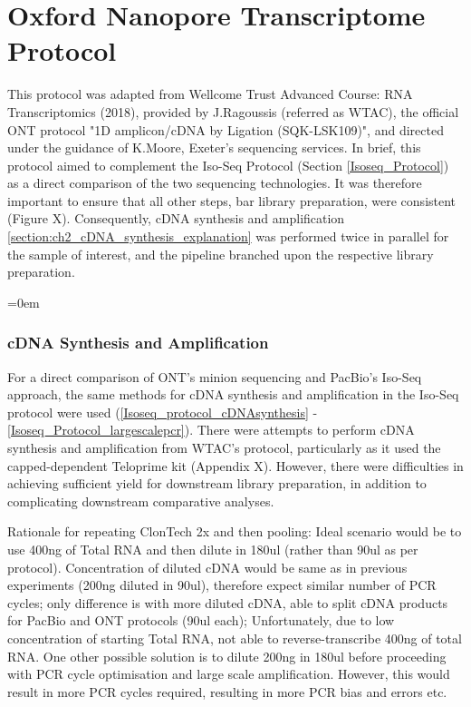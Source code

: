 \chapter{Oxford Nanopore Transcriptome Protocol}
\label{app_longread_ont_protocol}


This protocol was adapted from Wellcome Trust Advanced Course: RNA Transcriptomics (2018), provided by J.Ragoussis (referred as WTAC), the official ONT protocol "1D amplicon/cDNA by Ligation (SQK-LSK109)", and directed under the guidance of K.Moore, Exeter's sequencing services. In brief, this protocol aimed to complement the Iso-Seq Protocol (Section \ref{Isoseq_Protocol}) as a direct comparison of the two sequencing technologies. It was therefore important to ensure that all other steps, bar library preparation, were consistent (Figure X). Consequently, cDNA synthesis and amplification \ref{section:ch2_cDNA_synthesis_explanation} was performed twice in parallel for the sample of interest, and the pipeline branched upon the respective library preparation.   

\begingroup
\parindent=0em
\localtableofcontents 
\endgroup

\subsection{cDNA Synthesis and Amplification}
For a direct comparison of ONT's minion sequencing and PacBio's Iso-Seq approach, the same methods for cDNA synthesis and amplification in the Iso-Seq protocol were used (\cref{Isoseq_protocol_cDNAsynthesis} - \cref{Isoseq_Protocol_largescalepcr}). There were attempts to perform cDNA synthesis and amplification from WTAC's protocol, particularly as it used the capped-dependent Teloprime kit (Appendix X). However, there were difficulties in achieving sufficient yield for downstream library preparation, in addition to complicating downstream comparative analyses.

Rationale for repeating ClonTech 2x and then pooling: Ideal scenario would be to use 400ng of Total RNA and then dilute in 180ul (rather than 90ul as per protocol). Concentration of diluted cDNA would be same as in previous experiments (200ng diluted in 90ul), therefore expect similar number of PCR cycles; only difference is with more diluted cDNA, able to split cDNA products for PacBio and ONT protocols (90ul each); Unfortunately, due to low concentration of starting Total RNA, not able to reverse-transcribe 400ng of total RNA. One other possible solution is to dilute 200ng in 180ul before proceeding with PCR cycle optimisation and large scale amplification. However, this would result in more PCR cycles required, resulting in more PCR bias and errors etc.   

